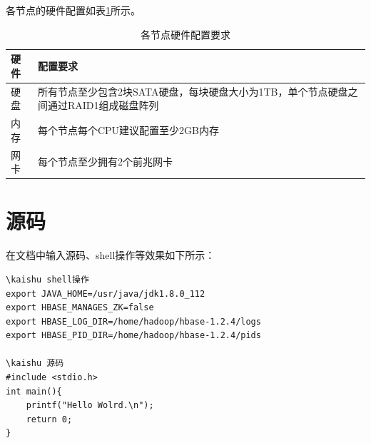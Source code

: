 各节点的硬件配置如表\ref{tableExample}所示。

\begin{table}[htb]
\centering
\label{tableExample}
\begin{tabular}{p{3cm}|p{9cm}}
\hline\hline

\textbf{硬件} & \textbf{配置要求} \\
\hline\hline

硬盘 & 所有节点至少包含2块SATA硬盘，每块硬盘大小为1TB，单个节点硬盘之间通过RAID1组成磁盘阵列 \\
\hline

内存 & 每个节点每个CPU建议配置至少2GB内存 \\
\hline

网卡 & 每个节点至少拥有2个前兆网卡 \\
\hline

\hline\hline
\end{tabular}
\caption{各节点硬件配置要求}
\end{table}


\section{源码}
在文档中输入源码、shell操作等效果如下所示：

\begin{Verbatim}[]
\kaishu shell操作
export JAVA_HOME=/usr/java/jdk1.8.0_112
export HBASE_MANAGES_ZK=false
export HBASE_LOG_DIR=/home/hadoop/hbase-1.2.4/logs
export HBASE_PID_DIR=/home/hadoop/hbase-1.2.4/pids

\kaishu 源码
#include <stdio.h>
int main(){
    printf("Hello Wolrd.\n");
    return 0;
}
\end{Verbatim}


